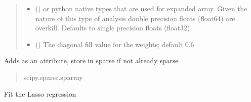 \documentclass[letterpaper,10pt,english]{sphinxmanual}
\begin{document}
\begin{fulllineitems}
\begin{fulllineitems}
\begin{quote}
\begin{description}
\begin{itemize}
\item {}
\sphinxAtStartPar
{} () \textendash{}  or python native  types that are used for
expanded array. Given the nature of this type of analysis
double precision floats (float64) are overkill. Defaults
to single precision floats (float32).

\item {}
\sphinxAtStartPar
{} () \textendash{} The diagonal fill value for the weights; default 0.6

\end{itemize}

\end{description}\end{quote}

\begin{fulllineitems}
\label{\detokenize{kalman:glomar_gridding.autocorrelation.LassoEstimate_AR1.D}}
\pysigstartsignatures
\pysigline
{}
\pysigstopsignatures
\sphinxAtStartPar
Adds  as an attribute,
store in sparse if not already sparse
\begin{quote}\begin{description}
\sphinxAtStartPar
scipy.sparse.sparray

\end{description}\end{quote}

\end{fulllineitems}


\end{fulllineitems}


\begin{fulllineitems}
\label{\detokenize{kalman:glomar_gridding.autocorrelation.LassoEstimate_AR1.fit}}
\pysigstartsignatures
\pysiglinewithargsret
{}
{}
{}
\pysigstopsignatures
\sphinxAtStartPar
Fit the Lasso regression


\end{fulllineitems}
\end{fulllineitems}
\end{document}
